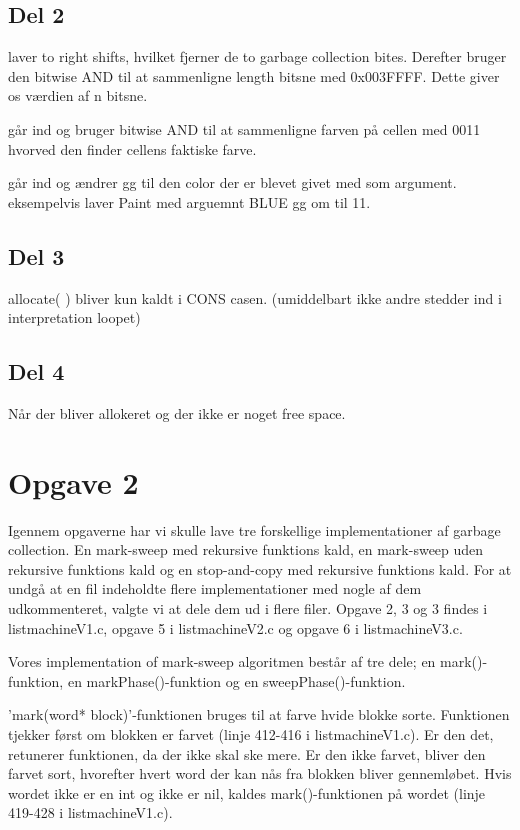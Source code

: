 \subsection{Del 2}
\label{O1_2}
\begin{my_itemize}
	\item[Length] laver to right shifts, hvilket fjerner de to garbage collection bites. Derefter bruger den bitwise AND til at sammenligne length bitsne med 0x003FFFF. Dette giver os værdien af n bitsne.
	\item[Color] går ind og bruger bitwise AND til at sammenligne farven på cellen med 0011 hvorved den finder cellens faktiske farve.
	\item[Paint] går ind og ændrer gg til den color der er blevet givet med som argument. eksempelvis laver Paint med arguemnt BLUE gg om til 11.
\end{my_itemize}

\subsection{Del 3}
\label{O1_3}
allocate( ) bliver kun kaldt i CONS casen.  (umiddelbart ikke andre stedder ind i interpretation loopet)

\subsection{Del 4}
\label{O1_4}
Når der bliver allokeret og der ikke er noget free space.

\section{Opgave 2}
\label{O2}
Igennem opgaverne har vi skulle lave tre forskellige implementationer af garbage collection. En mark-sweep med rekursive funktions kald, en mark-sweep uden rekursive funktions kald og en stop-and-copy med rekursive funktions kald. For at undgå at en fil indeholdte flere implementationer med nogle af dem udkommenteret, valgte vi at dele dem ud i flere filer. Opgave 2, 3 og 3 findes i listmachineV1.c, opgave 5 i listmachineV2.c og opgave 6 i listmachineV3.c.

Vores implementation of mark-sweep algoritmen består af tre dele; en mark()-funktion, en markPhase()-funktion og en sweepPhase()-funktion. 

'mark(word* block)'-funktionen bruges til at farve hvide blokke sorte. Funktionen tjekker først om blokken er farvet (linje 412-416 i listmachineV1.c). Er den det, retunerer funktionen, da der ikke skal ske mere. Er den ikke farvet, bliver den farvet sort, hvorefter hvert word der kan nås fra blokken bliver gennemløbet. Hvis wordet ikke er en int og ikke er nil, kaldes mark()-funktionen på wordet (linje 419-428 i listmachineV1.c).

